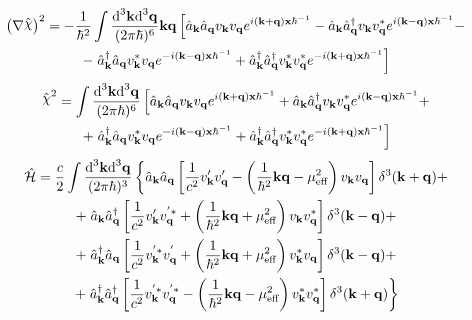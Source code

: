 \documentclass[pt=11, openany,twoside,a4paper]{scrbook}
\DeclareRobustCommand{\rchi}{{\mathpalette\irchi\relax}}
\newcommand{\irchi}[2]{\raisebox{\depth}{$#1\chi$}} %
\begin{document}
	\begin{multline}
		\left(\mathbf{\nabla}\hat{\rchi}\right)^2=-\frac{1}{\hbar^2}\int\frac{\td^3\mathbf{k}\td^3\mathbf{q}}{(2\pi\hbar)^6}\mathbf{k}\mathbf{q}\left[\hat{a}_\mathbf{k}\hat{a}_\mathbf{q}v_\mathbf{k}v_\mathbf{q}e^{i(\mathbf{k}+\mathbf{q})\mathbf{x}\hbar^{-1}}-\hat{a}_\mathbf{k}\hat{a}_\mathbf{q}^\dagger v_\mathbf{k}v^*_\mathbf{q}e^{i(\mathbf{k}-\mathbf{q})\mathbf{x}\hbar^{-1}}-\right.\\
		-\left.\hat{a}_\mathbf{k}^\dagger\hat{a}_\mathbf{q}v_\mathbf{k}^*v_\mathbf{q}e^{-i(\mathbf{k}-\mathbf{q})\mathbf{x}\hbar^{-1}}+\hat{a}^\dagger_\mathbf{k}\hat{a}^\dagger_\mathbf{q}v^*_\mathbf{k}v^*_\mathbf{q}e^{-i(\mathbf{k}+\mathbf{q})\mathbf{x}\hbar^{-1}}\right]
	\end{multline}
	\begin{multline}
		\hat{\rchi}^2=\int\frac{\td^3\mathbf{k}\td^3\mathbf{q}}{(2\pi\hbar)^6}\left[\hat{a}_\mathbf{k}\hat{a}_\mathbf{q}v_\mathbf{k}v_\mathbf{q}e^{i(\mathbf{k}+\mathbf{q})\mathbf{x}\hbar^{-1}}+\hat{a}_\mathbf{k}\hat{a}_\mathbf{q}^\dagger v_\mathbf{k}v^*_\mathbf{q}e^{i(\mathbf{k}-\mathbf{q})\mathbf{x}\hbar^{-1}}+\right.\\
		+\left.\hat{a}_\mathbf{k}^\dagger\hat{a}_\mathbf{q}v_\mathbf{k}^*v_\mathbf{q}e^{-i(\mathbf{k}-\mathbf{q})\mathbf{x}\hbar^{-1}}+\hat{a}^\dagger_\mathbf{k}\hat{a}^\dagger_\mathbf{q}v^*_\mathbf{k}v^*_\mathbf{q}e^{-i(\mathbf{k}+\mathbf{q})\mathbf{x}\hbar^{-1}}\right]
	\end{multline}
	\begin{multline}
		\hat{\mathcal{H}}=\frac{c}{2}\int\frac{\text{d}^3\mathbf{k}\text{d}^3\mathbf{q}}{(2\pi\hbar)^3}\left\{\hat{a}_\mathbf{k}\hat{a}_\mathbf{q}\left[\frac{1}{c^2}v'_\mathbf{k}v'_\mathbf{q}-\left(\frac{1}{\hbar^2}\mathbf{k}\mathbf{q}-\mu^2_{\text{eff}}\right)v_\mathbf{k}v_\mathbf{q}\right]\delta^3(\mathbf{k}+\mathbf{q})+\right.\\
		+\left.\hat{a}_\mathbf{k}\hat{a}^\dagger_\mathbf{q}\left[\frac{1}{c^2}v'_\mathbf{k}v^{'*}_\mathbf{q}+\left(\frac{1}{\hbar^2}\mathbf{k}\mathbf{q}+\mu^2_{\text{eff}}\right)v_\mathbf{k}v^*_\mathbf{q}\right]\delta^3(\mathbf{k}-\mathbf{q})+\right.\\
		+\left.\hat{a}^\dagger_\mathbf{k}\hat{a}_\mathbf{q}\left[\frac{1}{c^2}v^{'*}_\mathbf{k}v^{'}_\mathbf{q}+\left(\frac{1}{\hbar^2}\mathbf{k}\mathbf{q}+\mu^2_{\text{eff}}\right)v^*_\mathbf{k}v_\mathbf{q}\right]\delta^3(\mathbf{k}-\mathbf{q})+\right.\\
		+\left.\hat{a}^\dagger_\mathbf{k}\hat{a}^\dagger_\mathbf{q}\left[\frac{1}{c^2}v^{'*}_\mathbf{k}v^{'*}_\mathbf{q}-\left(\frac{1}{\hbar^2}\mathbf{k}\mathbf{q}-\mu^2_{\text{eff}}\right)v^*_\mathbf{k}v^*_\mathbf{q}\right]\delta^3(\mathbf{k}+\mathbf{q})\right\}
	\end{multline}
\end{document}
